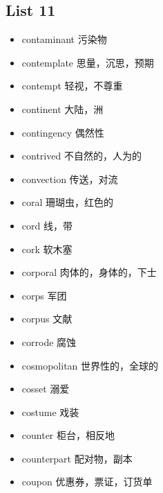 \documentclass[a4paper,10pt]{article}
\begin{document}
\begin{CJK*}{UTF8}{gkai}
\newpage
\section{List 11}
\begin{itemize}
\item contaminant 污染物 
\hspace{1cm}
\item contemplate 思量，沉思，预期
\hspace{1cm}
\item contempt 轻视，不尊重
\hspace{1cm}
\item continent 大陆，洲
\hspace{1cm}
\item contingency 偶然性
\hspace{1cm}
\item contrived 不自然的，人为的
\hspace{1cm}
\item convection 传送，对流
\hspace{1cm}
\item coral 珊瑚虫，红色的
\hspace{1cm}
\item cord 线，带
\hspace{1cm}
\item cork 软木塞
\hspace{1cm}
\item corporal 肉体的，身体的，下士
\hspace{1cm}
\item corps 军团
\hspace{1cm}
\item corpus 文献
\hspace{1cm}
\item corrode 腐蚀
\hspace{1cm}
\item cosmopolitan 世界性的，全球的
\hspace{1cm}
\item cosset 溺爱
\hspace{1cm}
\item costume 戏装
\hspace{1cm}
\item counter 柜台，相反地
\hspace{1cm}
\item counterpart 配对物，副本
\hspace{1cm}
\item coupon 优惠券，票证，订货单
\hspace{1cm}
\end{itemize}


\end{CJK*}
\end{document}
